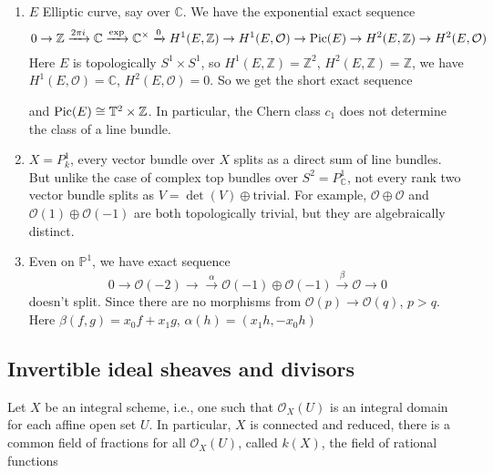 \documentclass[main]{subfiles}
\begin{document}
\begin{example}\hfill
\begin{enumerate}
\item 
$E$ Elliptic curve, say over $\mathbb C$. We have the exponential exact sequence
\[0\to \mathbb Z\xrightarrow{2\pi i}\mathbb C\xrightarrow{\exp}\mathbb C^\times\xrightarrow{0} H^1(E,\mathbb Z)\to H^1(E,\mathcal O)\to\operatorname{Pic}(E)\to H^2(E,\mathbb Z)\to H^2(E,\mathcal O)\]
Here $E$ is topologically $S^1\times S^1$, so $H^1(E,\mathbb Z)=\mathbb Z^2$, $H^2(E,\mathbb Z)=\mathbb Z$, we have $H^1(E,\mathcal O)=\mathbb C$, $H^2(E,\mathcal O)=0$. So we get the short exact sequence
\begin{center}
\end{center}
and $\operatorname{Pic}(E)\cong\mathbb T^2\times\mathbb Z$. In particular, the Chern class $c_1$ does not determine the class of a line bundle.
\item $X=P^1_k$, every vector bundle over $X$ splits as a direct sum of line bundles. But unlike the case of complex top bundles over $S^2=P^1_{\mathbb C}$, not every rank two vector bundle splits as $V=\det(V)\oplus\text{trivial}$. For example, $\mathcal O\oplus \mathcal O$ and $\mathcal O(1)\oplus\mathcal O(-1)$ are both topologically trivial, but they are algebraically distinct.
\item Even on $\mathbb P^1$, we have exact sequence
\[0\to \mathcal O(-2)\to\xrightarrow{\alpha} \mathcal O(-1)\oplus \mathcal O(-1)\xrightarrow{\beta} \mathcal O\to0\]
doesn't split. Since there are no morphisms from $\mathcal O(p)\to \mathcal O(q)$, $p>q$. Here $\beta(f,g)=x_0f+x_1g$, $\alpha(h)=(x_1h,-x_0h)$
\end{enumerate}
\end{example}


\subsection{Invertible ideal sheaves and divisors}

Let $X$ be an integral scheme, i.e., one such that $\mathcal O_X(U)$ is an integral domain for each affine open set $U$. In particular, $X$ is connected and reduced, there is a common field of fractions for all $\mathcal O_X(U)$, called $k(X)$, the field of rational functions
\end{document}
